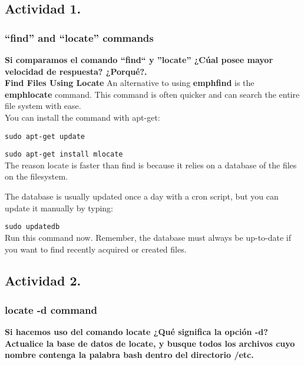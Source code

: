 \documentclass[a4paper,11pt,spanish]{article} %
\begin{document}
\subsection{Actividad 1.}

\subsubsection{``find'' and ``locate'' commands}

\textbf{Si comparamos el comando ``find`` y ''locate'' ¿Cúal posee mayor 
velocidad de respuesta? ¿Porqué?.}\\

\textbf{Find Files Using Locate}
An alternative to using \textbf{emph{find}} is the \textbf{emph{locate}} command. 
This command is often quicker and can search the entire file system with ease.\\

You can install the command with apt-get:

\texttt{sudo apt-get update}

\texttt{sudo apt-get install mlocate}\\

The reason locate is faster than find is because it relies on a database of the 
files on the filesystem.

The database is usually updated once a day with a cron script, but you can update it manually
by typing:

\texttt{sudo updatedb}\\

Run this command now. Remember, the database must always be up-to-date if you want
to find recently acquired or created files.\\

\cite{digitalocean}

\subsection{Actividad 2.}

\subsubsection{locate -d command}

\textbf{Si hacemos uso del comando locate ¿Qué significa la opción -d? Actualice la base de
datos de locate, y busque todos los archivos cuyo nombre contenga la palabra bash 
dentro del directorio /etc.}\\
\end{document}
